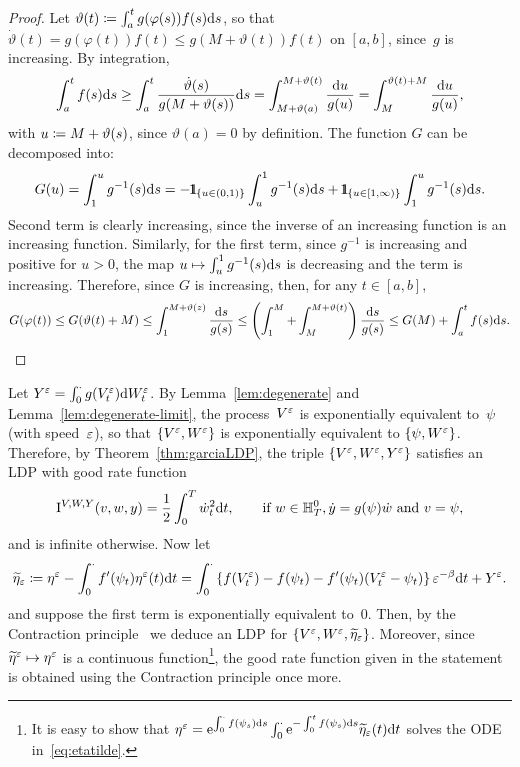 \begin{proof}
Let $\vartheta(t) \coloneqq \int_a^{t} g(\varphi(s))f(s)\mathrm{d} s$, so that
$\dot{\vartheta}(t) = g(\varphi(t))f(t) \leq g(M+\vartheta(t)) f(t)$ on $[a,b]$,
since~$g$ is increasing. By integration,
$$
\int_a^tf(s)\mathrm{d} s \geq \int_a^t \frac{\dot{\vartheta}(s)}{g(M+\vartheta(s))}\mathrm{d} s 
= \int_{M+\vartheta(a)}^{M+\vartheta(t)}\frac{\mathrm{d} u}{g(u)}
=  \int_{M}^{\vartheta(t)+M}\frac{\mathrm{d} u}{g(u)},
$$
with $u\coloneqq M+\vartheta(s)$, since $\vartheta(a)=0$ by definition. The function $G$ can be decomposed into:
\[
G(u) = \int_1^u g^{-1}(s)\D s = - \ind_{\{u\in(0,1)\}} \int_u^1 g^{-1}(s)\D s + \ind_{\{u\in[1,\infty)\}}\int_1^u g^{-1}(s)\D s.
\]
Second term is clearly increasing, since the inverse of an increasing function is an increasing function. Similarly, for the first term, since $g^{-1}$ is increasing and positive for $u>0$, the map $u\mapsto\int_u^1g^{-1}(s)\mathrm{d} s$ is decreasing and the term is increasing. Therefore, since $G$ is increasing, then, for any $t\in[a,b]$,
$$
G(\varphi(t)) \leq G(\vartheta(t) + M) 
\leq \int_1^{M +\vartheta(z)}\frac{\mathrm{d} s}{g(s)}
\leq \left(\int_{1}^{M}+ \int_{M}^{M+\vartheta(t)}\right)\frac{\mathrm{d} s}{g(s)}
\leq G(M) + \int_a^t f(s)\mathrm{d} s.
$$
\end{proof}
Let $Y^\varepsilon=\int_0^\cdot g(V^\varepsilon_t)\mathrm{d} W_t^{\varepsilon}$.
By Lemma~\ref{lem:degenerate} and Lemma~\ref{lem:degenerate-limit}, 
the process~$V^\varepsilon$ is exponentially equivalent to~$\psi$
(with speed~$\varepsilon$),
so that $\{V^\varepsilon,W^{\varepsilon}\}$ is exponentially equivalent to $\{\psi,W^{\varepsilon}\}$. 
Therefore, by Theorem~\ref{thm:garciaLDP}, the triple $\{V^\varepsilon,W^{\varepsilon},Y^\varepsilon\}$ satisfies an LDP with good rate function
$$
\mathrm{I}^{V,W,Y}(v,w,y) = 
\frac{1}{2}\int_0^T\dot{w}_t^2\mathrm{d} t,
\qquad \text{if } w \in \mathbb{H}_T^0,\dot{y} = g(\psi)\dot{w} \text{ and } v = \psi,
$$
and is infinite otherwise. Now let 
\begin{equation}\label{eq:etatilde}
\widetilde{\eta}_\varepsilon \coloneqq \eta^{\varepsilon} - \int_0^\cdot f'(\psi_t)\eta^\varepsilon(t) \mathrm{d} t = \int_0^\cdot \left\{f(V^\varepsilon_t) - f(\psi_t) - f'(\psi_t)(V^\varepsilon_t - \psi_t)\right\}\varepsilon^{-\beta}\mathrm{d} t + Y^\varepsilon.
\end{equation}
and suppose the first term is exponentially equivalent to~$0$. Then, by the Contraction principle~\cite[Theorem 4.2.1]{Dembo2010LargeApplications} 
we deduce an LDP for $\{V^\varepsilon, W^{\varepsilon}, \widetilde{\eta}_\varepsilon\}$. Moreover, since $\widetilde{\eta}^\varepsilon \mapsto \eta^\varepsilon$ is a continuous function\footnote{It is easy to show that $\eta^{\varepsilon} =\mathrm{e}^{\int_0^\cdot f(\psi_s)\mathrm{d} s}\int_0^\cdot \mathrm{e}^{-\int_0^t f(\psi_s)\mathrm{d} s}\widetilde{\eta}_\varepsilon(t) \mathrm{d} t $ solves the ODE in~\eqref{eq:etatilde}.}, the good rate function given in the statement is obtained using the Contraction principle once more. 
